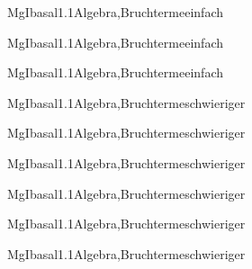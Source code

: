 \documentclass[12pt]{article}
\begin{document}
\begin{Add}{MgI}{basal1.1}{Algebra,Bruchterme}{einfach}
\end{Add}

\begin{Add}{MgI}{basal1.1}{Algebra,Bruchterme}{einfach}
\end{Add}
\begin{Add}{MgI}{basal1.1}{Algebra,Bruchterme}{einfach}
\end{Add}

\begin{Add}{MgI}{basal1.1}{Algebra,Bruchterme}{schwieriger}
\end{Add}

\begin{Add}{MgI}{basal1.1}{Algebra,Bruchterme}{schwieriger}
\end{Add}

\begin{Add}{MgI}{basal1.1}{Algebra,Bruchterme}{schwieriger}
\end{Add}

\begin{Add}{MgI}{basal1.1}{Algebra,Bruchterme}{schwieriger}
\end{Add}

\begin{Add}{MgI}{basal1.1}{Algebra,Bruchterme}{schwieriger}
\end{Add}

\begin{Add}{MgI}{basal1.1}{Algebra,Bruchterme}{schwieriger}
\end{Add}
\end{document}
